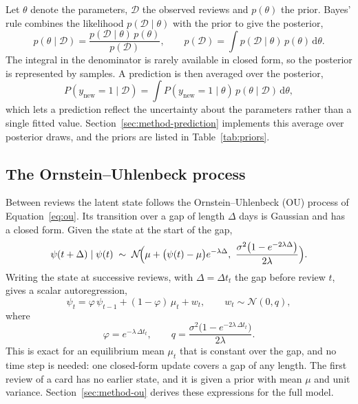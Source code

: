 Let $\theta$ denote the parameters, $\mathcal{D}$ the observed reviews and $p(\theta)$ the prior. Bayes' rule combines the likelihood $p(\mathcal{D}\mid\theta)$ with the prior to give the posterior,
\begin{equation}
  p(\theta \mid \mathcal{D}) = \frac{p(\mathcal{D}\mid\theta)\,p(\theta)}{p(\mathcal{D})},
  \qquad p(\mathcal{D}) = \int p(\mathcal{D}\mid\theta)\,p(\theta)\,\mathrm{d}\theta.
  \label{eq:intro-bayes}
\end{equation}
The integral in the denominator is rarely available in closed form, so the posterior is represented by samples. A prediction is then averaged over the posterior,
\begin{equation}
  P(y_{\mathrm{new}}=1 \mid \mathcal{D}) = \int P(y_{\mathrm{new}}=1 \mid \theta)\,p(\theta \mid \mathcal{D})\,\mathrm{d}\theta,
  \label{eq:intro-predictive}
\end{equation}
which lets a prediction reflect the uncertainty about the parameters rather than a single fitted value. Section~\ref{sec:method-prediction} implements this average over posterior draws, and the priors are listed in Table~\ref{tab:priors}.

\subsection{The Ornstein--Uhlenbeck process}
\label{sec:intro-math-ou}

Between reviews the latent state follows the Ornstein--Uhlenbeck (OU) process of Equation~\eqref{eq:ou}. Its transition over a gap of length $\Delta$ days is Gaussian and has a closed form. Given the state at the start of the gap,
\begin{equation}
  \psi(t+\Delta) \mid \psi(t) \;\sim\; \mathcal{N}\!\Bigl(\mu + \bigl(\psi(t)-\mu\bigr)e^{-\lambda\Delta},\
  \frac{\sigma^2\bigl(1-e^{-2\lambda\Delta}\bigr)}{2\lambda}\Bigr).
  \label{eq:intro-ou-exact}
\end{equation}
Writing the state at successive reviews, with $\Delta = \Delta t_t$ the gap before review $t$, gives a scalar autoregression,
\begin{equation}
  \psi_t = \varphi\,\psi_{t-1} + (1-\varphi)\,\mu_t + w_t, \qquad w_t \sim \mathcal{N}(0, q),
  \label{eq:intro-ar1}
\end{equation}
where
\begin{equation}
  \varphi = e^{-\lambda\,\Delta t_t}, \qquad q = \frac{\sigma^2\bigl(1-e^{-2\lambda\,\Delta t_t}\bigr)}{2\lambda}.
  \label{eq:intro-phi-q}
\end{equation}
This is exact for an equilibrium mean $\mu_t$ that is constant over the gap, and no time step is needed: one closed-form update covers a gap of any length. The first review of a card has no earlier state, and it is given a prior with mean $\mu$ and unit variance. Section~\ref{sec:method-ou} derives these expressions for the full model.

